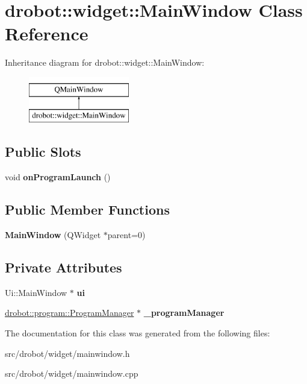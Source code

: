 \hypertarget{classdrobot_1_1widget_1_1MainWindow}{\section{drobot\-:\-:widget\-:\-:Main\-Window Class Reference}
\label{classdrobot_1_1widget_1_1MainWindow}
}
Inheritance diagram for drobot\-:\-:widget\-:\-:Main\-Window\-:\begin{figure}[H]
\begin{center}
\leavevmode
\includegraphics[height=2.000000cm]{classdrobot_1_1widget_1_1MainWindow}
\end{center}
\end{figure}
\subsection*{Public Slots}
\begin{DoxyCompactItemize}
\item 
\hypertarget{classdrobot_1_1widget_1_1MainWindow_a92780b8f96de5ace56e84ee1e3ef70a2}{void {\bfseries on\-Program\-Launch} ()}\label{classdrobot_1_1widget_1_1MainWindow_a92780b8f96de5ace56e84ee1e3ef70a2}

\end{DoxyCompactItemize}
\subsection*{Public Member Functions}
\begin{DoxyCompactItemize}
\item 
\hypertarget{classdrobot_1_1widget_1_1MainWindow_a3bc62fbbc0ba5600e8c757fde568a2cb}{{\bfseries Main\-Window} (Q\-Widget $\ast$parent=0)}\label{classdrobot_1_1widget_1_1MainWindow_a3bc62fbbc0ba5600e8c757fde568a2cb}

\end{DoxyCompactItemize}
\subsection*{Private Attributes}
\begin{DoxyCompactItemize}
\item 
\hypertarget{classdrobot_1_1widget_1_1MainWindow_ac4f80ce65cb4cb0f464b13fe9757503a}{Ui\-::\-Main\-Window $\ast$ {\bfseries ui}}\label{classdrobot_1_1widget_1_1MainWindow_ac4f80ce65cb4cb0f464b13fe9757503a}

\item 
\hypertarget{classdrobot_1_1widget_1_1MainWindow_a98317c5c39848f3dea6696d3c6f29de3}{\hyperlink{classdrobot_1_1program_1_1ProgramManager}{drobot\-::program\-::\-Program\-Manager} $\ast$ {\bfseries \-\_\-program\-Manager}}\label{classdrobot_1_1widget_1_1MainWindow_a98317c5c39848f3dea6696d3c6f29de3}

\end{DoxyCompactItemize}


The documentation for this class was generated from the following files\-:\begin{DoxyCompactItemize}
\item 
src/drobot/widget/mainwindow.\-h\item 
src/drobot/widget/mainwindow.\-cpp\end{DoxyCompactItemize}
